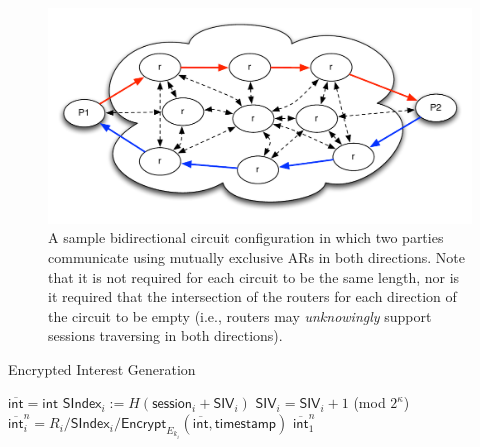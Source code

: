 \documentclass[10pt]{article}
\begin{document}
\begin{figure}[ht!]
\begin{center}
\includegraphics[scale=0.5]{./images/pool.pdf}
\end{center}
\caption{A sample bidirectional circuit configuration in which two parties communicate using mutually exclusive ARs in both directions. Note that it is not required for each circuit to be the same length, nor is it required that the intersection of the routers for each direction of the circuit to be empty (i.e., routers may \emph{unknowingly} support sessions traversing in both directions).}
\label{fig:pool}
\end{figure}

\begin{algorithm}[ht!]
  \caption{Encrypted Interest Generation}
  \begin{algorithmic}[1]
\State $\overline{\mathsf{int}} = \mathsf{int}$
  \State $\mathsf{SIndex}_i := H(\mathsf{session}_i + \mathsf{SIV}_i)$
  \State $\mathsf{SIV}_i = \mathsf{SIV}_i + 1$ (mod $2^{\kappa}$)
  \State $\overline{\mathsf{int}}_i^n = R_i / \mathsf{SIndex}_i / \mathsf{Encrypt}_{E_{k_i}}(\overline{\mathsf{int}}, \mathsf{timestamp})$
\EndFor
\State \Return $\overline{\mathsf{int}}_1^n$
\end{algorithmic}
\label{alg:enc_int_gen}
\end{algorithm}
\end{document}
